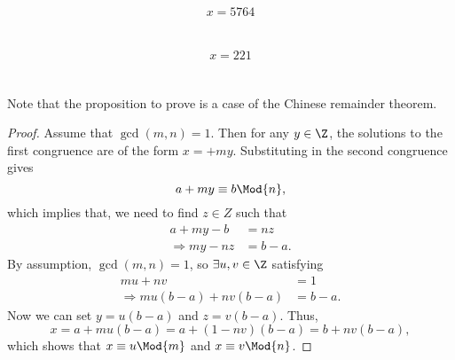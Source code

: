 \documentclass[
  coursecode={MTHE 418},
  assignmentname={Homework \homeworknumber},
  studentnumber=20053722,
  name={Bryan Hoang},
  draft,
  final,
]{
  ltxanswer%
}
\begin{document}
\begin{questions}
\begin{parts}
      \part{}
      \begin{solution}
        \begin{equation*}
          \boxed{x = 5764}
        \end{equation*}
      \end{solution}

      \part{}
      \begin{solution}
        \begin{equation*}
          \boxed{x = 221}
        \end{equation*}
      \end{solution}

      \part{}
      Note that the proposition to prove is a case of the Chinese remainder theorem.
      \begin{solution}
        \begin{proof}
          Assume that \(\gcd(m,n) = 1\). Then for any \(y \in \Z\), the solutions to the first congruence are of the form \(x =  + my\). Substituting in the second congruence gives
          \begin{equation*}
            a + my \equiv b \Mod{n},
          \end{equation*}
          which implies that, we need to find \(z \in Z\) such that
          \begin{align*}
            a + my - b          &= nz     \\
            \Rightarrow my - nz &= b - a.
          \end{align*}
          By assumption, \(\gcd(m,n) = 1\), so \(\exists u,v \in \Z\) satisfying
          \begin{align*}
            mu + nv                       &= 1      \\
            \Rightarrow mu(b-a) + nv(b-a) &= b - a.
          \end{align*}
          Now we can set \(y = u(b-a)\) and \(z = v(b-a)\). Thus,
          \begin{equation*}
            x = a + mu(b-a) = a + (1 - nv)(b - a) = b + nv(b - a),
          \end{equation*}
          which shows that \(x \equiv u \Mod{m}\) and \(x \equiv v \Mod{n}\).
        \end{proof}
      \end{solution}
    \end{parts}


\end{questions}
\end{document}
